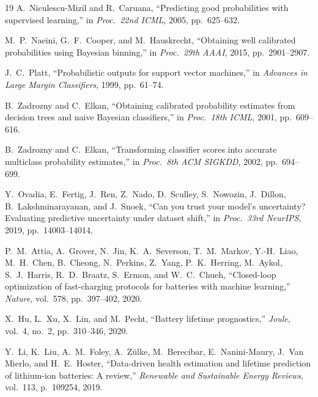 \documentclass[11pt,a4paper]{article}
\begin{document}
\begin{thebibliography}{19}
A.~Niculescu-Mizil and R.~Caruana, ``Predicting good probabilities with supervised learning,'' in \textit{Proc.~22nd ICML}, 2005, pp.~625--632.

M.~P.~Naeini, G.~F.~Cooper, and M.~Hauskrecht, ``Obtaining well calibrated probabilities using Bayesian binning,'' in \textit{Proc.~29th AAAI}, 2015, pp.~2901--2907.

J.~C.~Platt, ``Probabilistic outputs for support vector machines,'' in \textit{Advances in Large Margin Classifiers}, 1999, pp.~61--74.

B.~Zadrozny and C.~Elkan, ``Obtaining calibrated probability estimates from decision trees and naive Bayesian classifiers,'' in \textit{Proc.~18th ICML}, 2001, pp.~609--616.

B.~Zadrozny and C.~Elkan, ``Transforming classifier scores into accurate multiclass probability estimates,'' in \textit{Proc.~8th ACM SIGKDD}, 2002, pp.~694--699.

Y.~Ovadia, E.~Fertig, J.~Ren, Z.~Nado, D.~Sculley, S.~Nowozin, J.~Dillon, B.~Lakshminarayanan, and J.~Snoek, ``Can you trust your model's uncertainty? Evaluating predictive uncertainty under dataset shift,'' in \textit{Proc.~33rd NeurIPS}, 2019, pp.~14003--14014.

P.~M.~Attia, A.~Grover, N.~Jin, K.~A.~Severson, T.~M.~Markov, Y.-H.~Liao, M.~H.~Chen, B.~Cheong, N.~Perkins, Z.~Yang, P.~K.~Herring, M.~Aykol, S.~J.~Harris, R.~D.~Braatz, S.~Ermon, and W.~C.~Chueh, ``Closed-loop optimization of fast-charging protocols for batteries with machine learning,'' \textit{Nature}, vol.~578, pp.~397--402, 2020.

X.~Hu, L.~Xu, X.~Lin, and M.~Pecht, ``Battery lifetime prognostics,'' \textit{Joule}, vol.~4, no.~2, pp.~310--346, 2020.

Y.~Li, K.~Liu, A.~M.~Foley, A.~Zülke, M.~Berecibar, E.~Nanini-Maury, J.~Van Mierlo, and H.~E.~Hoster, ``Data-driven health estimation and lifetime prediction of lithium-ion batteries: A review,'' \textit{Renewable and Sustainable Energy Reviews}, vol.~113, p.~109254, 2019.

\end{thebibliography}
\end{document}
